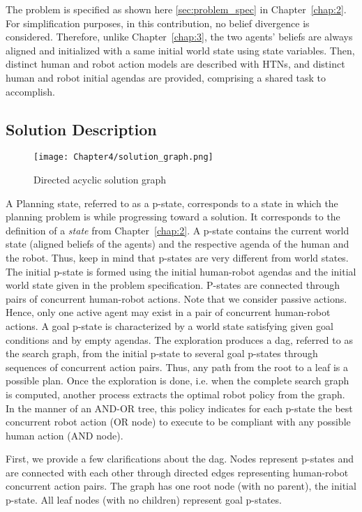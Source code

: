 The problem is specified as shown here \ref{sec:problem_spec} in Chapter~\ref{chap:2}. For simplification purposes, in this contribution, no belief divergence is considered. Therefore, unlike Chapter~\ref{chap:3}, the two agents' beliefs are always aligned and initialized with a same initial world state using state variables. Then, distinct human and robot action models are described with HTNs, and distinct human and robot initial agendas are provided, comprising a shared task to accomplish. 

\subsection*{Solution Description}

\begin{figure}[h]
    \centering
    \texttt{[image: Chapter4/solution\_graph.png]}
    \caption{Directed acyclic solution graph}
    \label{fig:solution_graph}
\end{figure}

A Planning state, referred to as a p-state, corresponds to a state in which the planning problem is while progressing toward a solution. It corresponds to the definition of a \textit{state} from Chapter~\ref{chap:2}. A p-state contains the current world state (aligned beliefs of the agents) and the respective agenda of the human and the robot. Thus, keep in mind that p-states are very different from world states.
The initial p-state is formed using the initial human-robot agendas and the initial world state given in the problem specification. P-states are connected through pairs of concurrent human-robot actions. Note that we consider passive actions. Hence, only one active agent may exist in a pair of concurrent human-robot actions. A goal p-state is characterized by a world state satisfying given goal conditions and by empty agendas.
The exploration produces a \acrfull{dag}, referred to as the search graph, from the initial p-state to several goal p-states through sequences of concurrent action pairs. Thus, any path from the root to a leaf is a possible plan. Once the exploration is done, i.e. when the complete search graph is computed, another process extracts the optimal robot policy from the graph. In the manner of an AND-OR tree, this policy indicates for each p-state the best concurrent robot action (OR node) to execute to be compliant with any possible human action (AND node).


First, we provide a few clarifications about the \acrshort{dag}. Nodes represent p-states and are connected with each other through directed edges representing human-robot concurrent action pairs. The graph has one root node (with no parent), the initial p-state. All leaf nodes (with no children) represent goal p-states. 

